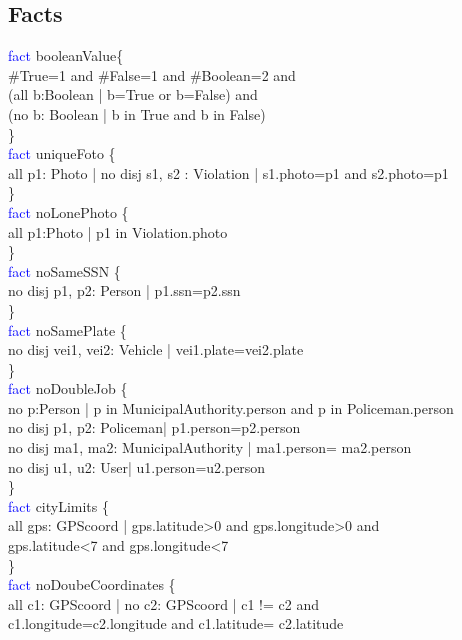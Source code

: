 \subsection{Facts}
\textcolor{blue}{fact}
\textcolor{mycolor}{booleanValue}\{\\
\#True=1 and \#False=1 and \#Boolean=2 and \\
(all b:Boolean | b=True or b=False) and\\
(no b: Boolean | b in True and b in False)\\
\}\\
\textcolor{blue}{fact}
\textcolor{mycolor}{uniqueFoto} \{\\
all p1: Photo | no disj s1, s2 : Violation | s1.photo=p1 and s2.photo=p1\\
\}\\
\textcolor{blue}{fact}
\textcolor{mycolor}{noLonePhoto} \{\\
all p1:Photo | p1 in Violation.photo\\
\}\\
\textcolor{blue}{fact}
\textcolor{mycolor}{noSameSSN} \{\\
no disj p1, p2: Person | p1.ssn=p2.ssn\\
\}\\
\textcolor{blue}{fact}
\textcolor{mycolor}{noSamePlate} \{\\
no disj vei1, vei2: Vehicle | vei1.plate=vei2.plate\\
\}\\
\textcolor{blue}{fact}
\textcolor{mycolor}{noDoubleJob} \{\\
no p:Person | p in MunicipalAuthority.person and p in Policeman.person\\
no disj p1, p2: Policeman| p1.person=p2.person\\
no disj ma1, ma2: MunicipalAuthority | ma1.person= ma2.person\\
no disj u1, u2: User| u1.person=u2.person\\
\}\\
\textcolor{blue}{fact}
\textcolor{mycolor}{cityLimits} \{\\
all gps: GPScoord | gps.latitude>0 and gps.longitude>0 and\\
gps.latitude<7 and gps.longitude<7\\
\}\\
\textcolor{blue}{fact}
\textcolor{mycolor}{noDoubeCoordinates} \{\\
all c1: GPScoord | no c2: GPScoord | c1 != c2 and\\ c1.longitude=c2.longitude and c1.latitude= c2.latitude\\
